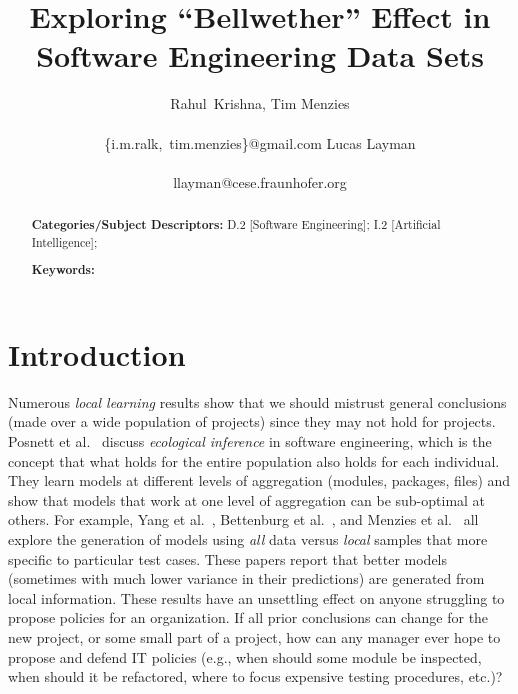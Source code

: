\documentclass{sig-alternate}
\theoremstyle{break}
\begin{document}

\title{  Exploring ``Bellwether'' Effect in Software Engineering Data Sets}
\author{
\alignauthor
Rahul~Krishna, Tim Menzies  \\
       \\
       {\{i.m.ralk,~tim.menzies\}@gmail.com}
\alignauthor
Lucas Layman \\
       \\
       {llayman@cese.fraunhofer.org}
\setlength{\columnsep}{7mm}}
\maketitle

\begin{abstract}

{\bf Categories/Subject Descriptors:} D.2 [Software Engineering]; I.2 [Artificial Intelligence];


{\bf Keywords:}
\end{abstract}

\section{Introduction}
Numerous {\em local learning} results show that we
should mistrust general conclusions (made over a
wide population of projects) since they may not hold
for projects.  Posnett et al.~\cite{posnet11}
discuss {\em ecological inference} in software
engineering, which is the concept that what holds
for the entire population also holds for each
individual.  They learn models at different levels
of aggregation (modules, packages, files) and show
that models that work at one level of aggregation
can be sub-optimal at others.  For example, Yang et
al.~\cite{yang11}, Bettenburg et
al.~\cite{Bettenburg2012}, and Menzies et al.~\cite{me12d}
all explore the generation of models using {\em all}
data versus {\em local} samples that more specific
to particular test cases. These papers report that
better models (sometimes with much lower variance in
their predictions) are generated from local
information.
These results have an unsettling effect on anyone
struggling to propose policies for an organization.
If all prior conclusions can change for the new
project, or some small part of a project, how can
any manager ever hope to propose and defend IT
policies (e.g., when should some module be inspected,
when should it be refactored, where to focus
expensive testing procedures, etc.)?
\end{document}
